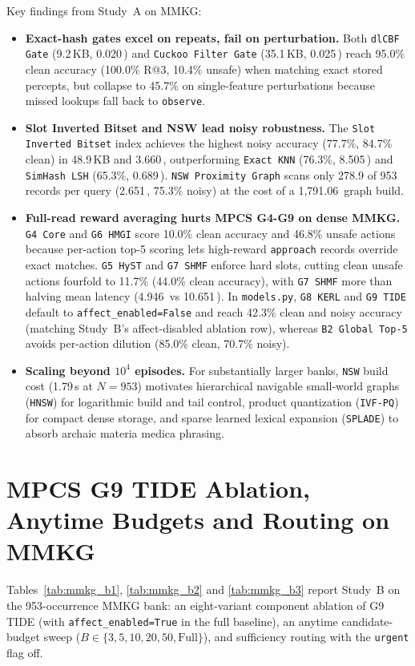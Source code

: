 \documentclass[12pt,a4paper,oneside]{report}
\newcommand{\code}[1]{\texttt{\small #1}}
\newcommand{\ms}{\,\text{ms}}
\begin{document}
\noindent Key findings from Study~A on MMKG:
\begin{itemize}
  \item \textbf{Exact-hash gates excel on repeats, fail on perturbation.} Both \code{dlCBF Gate} (9.2\,KB, 0.020\ms{}) and \code{Cuckoo Filter Gate} (35.1\,KB, 0.025\ms{}) reach 95.0\% clean accuracy (100.0\% R@3, 10.4\% unsafe) when matching exact stored percepts, but collapse to 45.7\% on single-feature perturbations because missed lookups fall back to \code{observe}.
  \item \textbf{Slot Inverted Bitset and NSW lead noisy robustness.} The \code{Slot Inverted Bitset} index achieves the highest noisy accuracy (77.7\%, 84.7\% clean) in 48.9\,KB and 3.660\ms{}, outperforming \code{Exact KNN} (76.3\%, 8.505\ms{}) and \code{SimHash LSH} (65.3\%, 0.689\ms{}). \code{NSW Proximity Graph} scans only 278.9 of 953 records per query (2.651\ms{}, 75.3\% noisy) at the cost of a 1,791.06\ms{} graph build.
  \item \textbf{Full-read reward averaging hurts MPCS G4-G9 on dense MMKG.} \code{G4 Core} and \code{G6 HMGI} score 10.0\% clean accuracy and 46.8\% unsafe actions because per-action top-5 scoring lets high-reward \code{approach} records override exact matches. \code{G5 HyST} and \code{G7 SHMF} enforce hard slots, cutting clean unsafe actions fourfold to 11.7\% (44.0\% clean accuracy), with \code{G7 SHMF} more than halving mean latency (4.946\ms{} vs 10.651\ms{}). In \code{models.py}, \code{G8 KERL} and \code{G9 TIDE} default to \code{affect\_enabled=False} and reach 42.3\% clean and noisy accuracy (matching Study~B's affect-disabled ablation row), whereas \code{B2 Global Top-5} avoids per-action dilution (85.0\% clean, 70.7\% noisy).
  \item \textbf{Scaling beyond $10^4$ episodes.} For substantially larger banks, \code{NSW} build cost (1.79\,s at $N=953$) motivates hierarchical navigable small-world graphs (\code{HNSW}) for logarithmic build and tail control, product quantization (\code{IVF-PQ}) for compact dense storage, and sparse learned lexical expansion (\code{SPLADE}) to absorb archaic materia medica phrasing.
\end{itemize}

\section{MPCS G9 TIDE Ablation, Anytime Budgets and Routing on MMKG}
Tables~\ref{tab:mmkg_b1}, \ref{tab:mmkg_b2} and \ref{tab:mmkg_b3} report Study~B on the 953-occurrence MMKG bank: an eight-variant component ablation of G9 TIDE (with \code{affect\_enabled=True} in the full baseline), an anytime candidate-budget sweep ($B \in \{3, 5, 10, 20, 50, \text{Full}\}$), and sufficiency routing with the \code{urgent} flag off.
\end{document}
